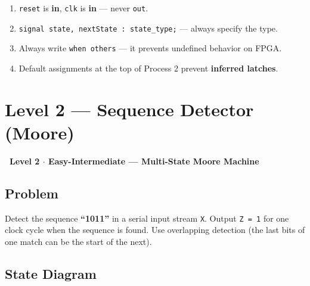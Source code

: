 \documentclass[12pt,a4paper]{article}
\newcommand{\faUnlock}{\ding{109}}
\newcommand{\levelbadge}[2]{%
  \begin{tcolorbox}[colback=#2!15, colframe=#2, arc=20pt,
    left=4pt, right=4pt, top=2pt, bottom=2pt,
    width=\linewidth, boxrule=1pt]
    \centering\sffamily\bfseries\large #1
  \end{tcolorbox}%
}
\begin{document}
\begin{tcolorbox}[notebox, title={Key Observations from Level 1}]
  \begin{enumerate}
    \item \texttt{reset} is \textbf{in}, \texttt{clk} is \textbf{in} --- never \texttt{out}.
    \item \texttt{signal state, nextState : state\_type;} --- always specify the type.
    \item Always write \texttt{when others} --- it prevents undefined behavior on FPGA.
    \item Default assignments at the top of Process 2 prevent \textbf{inferred latches}.
  \end{enumerate}
\end{tcolorbox}

\newpage

\section{Level 2 --- Sequence Detector (Moore)}

\levelbadge{\faUnlock\ Level 2 $\cdot$ Easy-Intermediate --- Multi-State Moore Machine}{accentblue}

\subsection{Problem}

Detect the sequence \textbf{``1011''} in a serial input stream \texttt{X}.
Output \texttt{Z = 1} for one clock cycle when the sequence is found.
Use overlapping detection (the last bits of one match can be the
start of the next).

\subsection{State Diagram}
\end{document}
